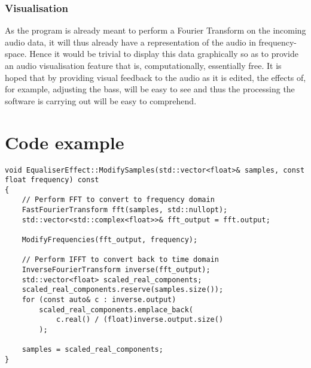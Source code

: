 \documentclass{article}
\begin{document}
	\subsubsection{Visualisation}
	As the program is already meant to perform a Fourier Transform on the incoming audio data, it will thus already have a representation of the audio in frequency-space. Hence it would be trivial to display this data graphically so as to provide an audio visualisation feature that is, computationally, essentially free. It is hoped that by providing visual feedback to the audio as it is edited, the effects of, for example, adjusting the bass, will be easy to see and thus the processing the software is carrying out will be easy to comprehend. 
	
	
	
	\section { Code example }
		\begin{verbatim}
void EqualiserEffect::ModifySamples(std::vector<float>& samples, const float frequency) const
{
	// Perform FFT to convert to frequency domain
	FastFourierTransform fft(samples, std::nullopt);
	std::vector<std::complex<float>>& fft_output = fft.output;
	
	ModifyFrequencies(fft_output, frequency);
	
	// Perform IFFT to convert back to time domain
	InverseFourierTransform inverse(fft_output);
	std::vector<float> scaled_real_components;
	scaled_real_components.reserve(samples.size());
	for (const auto& c : inverse.output)
		scaled_real_components.emplace_back(
			c.real() / (float)inverse.output.size()
		);
	
	samples = scaled_real_components;
}
	\end{verbatim}
	
	
\end{document}
